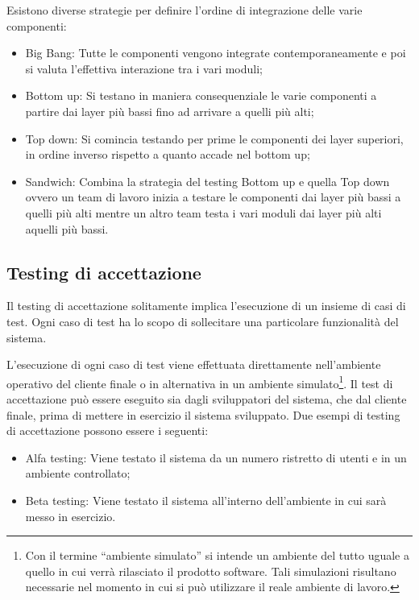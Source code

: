 Esistono diverse strategie per definire l’ordine di integrazione delle varie componenti:
\begin{itemize}
	\item Big Bang: Tutte le componenti vengono integrate contemporaneamente e poi si valuta l’effettiva interazione tra i vari moduli;
	\item Bottom up: Si testano in maniera consequenziale le varie componenti a partire dai layer più bassi fino ad arrivare a quelli più alti;
	\item Top down: Si comincia testando per prime le componenti dei layer superiori, in ordine inverso rispetto a quanto accade nel bottom up;
	\item Sandwich: Combina la strategia del testing Bottom up e quella Top down
	ovvero un team di lavoro inizia a testare le componenti dai layer più bassi a quelli più alti mentre un altro team testa i vari moduli dai layer più alti aquelli più bassi.
\end{itemize}
\subsection{Testing di accettazione}
Il testing di accettazione solitamente implica l’esecuzione di un insieme di casi di test. Ogni caso di test ha lo scopo di sollecitare una particolare funzionalità del sistema.

L’esecuzione di ogni caso di test viene effettuata direttamente nell’ambiente operativo del cliente finale o in alternativa in un ambiente simulato\footnote{Con il termine “ambiente simulato” si intende un ambiente del tutto uguale a quello in cui verrà rilasciato il prodotto software. Tali simulazioni risultano necessarie nel momento in cui si può utilizzare il reale ambiente di lavoro.}. Il test di accettazione può essere eseguito sia dagli sviluppatori del sistema, che dal cliente
finale, prima di mettere in esercizio il sistema sviluppato. Due esempi di testing di accettazione possono essere i seguenti:
\begin{itemize}
	\item Alfa testing: Viene testato il sistema da un numero ristretto di utenti e in un ambiente controllato;
	\item Beta testing: Viene testato il sistema all’interno dell’ambiente in cui sarà messo in esercizio.
\end{itemize}

